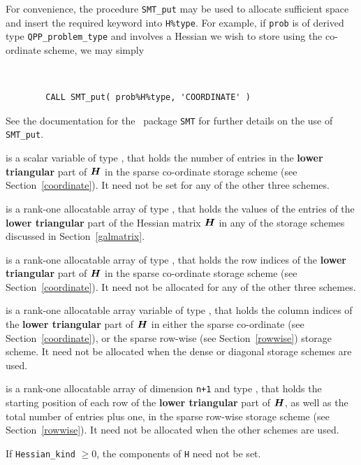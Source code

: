 \documentclass{galahad}
\newcommand{\packagename}{QPP}
\begin{document}
\begin{description}
\begin{description}
For convenience, the procedure {\tt SMT\_put} 
may be used to allocate sufficient space and insert the required keyword
into {\tt H\%type}.
For example, if {\tt prob} is of derived type {\tt \packagename\_problem\_type}
and involves a Hessian we wish to store using the co-ordinate scheme,
we may simply
{\tt 
\begin{verbatim}
        CALL SMT_put( prob%H%type, 'COORDINATE' )
\end{verbatim}
}
\noindent
See the documentation for the \galahad\ package {\tt SMT} 
for further details on the use of {\tt SMT\_put}.

 is a scalar variable of type \integer, that 
holds the number of entries in the {\bf lower triangular} part of ${\bm{H}}$
in the sparse co-ordinate storage scheme (see Section~\ref{coordinate}). 
It need not be set for any of the other three schemes.

 is a rank-one allocatable array of type \realdp, that holds
the values of the entries of the {\bf lower triangular} part
of the Hessian matrix ${\bm{H}}$ in any of the 
storage schemes discussed in Section~\ref{galmatrix}.

 is a rank-one allocatable array of type \integer,
that holds the row indices of the {\bf lower triangular} part of ${\bm{H}}$ 
in the sparse co-ordinate storage
scheme (see Section~\ref{coordinate}). 
It need not be allocated for any of the other three schemes.

 is a rank-one allocatable array variable of type \integer,
that holds the column indices of the {\bf lower triangular} part of 
${\bm{H}}$ in either the sparse co-ordinate 
(see Section~\ref{coordinate}), or the sparse row-wise 
(see Section~\ref{rowwise}) storage scheme.
It need not be allocated when the dense or diagonal storage schemes are used.

 is a rank-one allocatable array of dimension {\tt n+1} and type 
\integer, that holds the starting position of 
each row of the {\bf lower triangular} part of ${\bm{H}}$, as well
as the total number of entries plus one, in the sparse row-wise storage
scheme (see Section~\ref{rowwise}). It need not be allocated when the
other schemes are used.

\end{description}
If {\tt Hessian\_kind} $\geq 0$, the components of {\tt H} need not be set.


\end{description}
\end{document}
